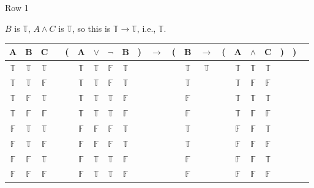 \documentclass[
  ignorenonframetext,
]{beamer}
\renewcommand{\,}{\text{, }}
\def\True{\mathbb{T}}
\def\False{\mathbb{F}}
\begin{document}
\begin{frame}{Row 1}
\protect\hypertarget{row-1}{}

\(B\) is \(\True\), \(A \wedge C\) is \(\True\), so this is
\(\True \rightarrow \True\), i.e., \(\True\).

\begin{center}
\bigskip
\begin{tabular}{@{ }c@{ }@{ }c@{ }@{ }c | c@{ }@{}c@{}@{ }c@{ }@{ }c@{ }@{ }c@{ }@{ }c@{ }@{}c@{}@{ }c@{ }@{}c@{}@{ }c@{ }@{ }c@{ }@{}c@{}@{ }c@{ }@{ }c@{ }@{ }c@{ }@{}c@{}@{}c@{}@{ }c}
A & B & C &  & ( & A & $\vee$ & $\neg$ & B & ) & $\rightarrow$ & ( & B & $\rightarrow$ & ( & A & $\wedge$ & C & ) & ) & \\
\hline 
 $\True$ & $\True$ & $\True$ &  &  & $\True$ & $\True$ & $\False$ & $\True$ &  &&  & $\True$ & $\True$ &  & $\True$ & $\True$ & $\True$ &  &  & \\
 $\True$ & $\True$ & $\False$ &  &  & $\True$ & $\True$ & $\False$ & $\True$ &  &&  & $\True$ &&  & $\True$ & $\False$ & $\False$ &  &  & \\
 $\True$ & $\False$ & $\True$ &  &  & $\True$ & $\True$ & $\True$ & $\False$ &  &&  & $\False$ &&  & $\True$ & $\True$ & $\True$ &  &  & \\
 $\True$ & $\False$ & $\False$ &  &  & $\True$ & $\True$ & $\True$ & $\False$ &  &&  & $\False$ &&  & $\True$ & $\False$ & $\False$ &  &  & \\
 $\False$ & $\True$ & $\True$ &  &  & $\False$ & $\False$ & $\False$ & $\True$ &  &&  & $\True$ &&  & $\False$ & $\False$ & $\True$ &  &  & \\
 $\False$ & $\True$ & $\False$ &  &  & $\False$ & $\False$ & $\False$ & $\True$ &  &&  & $\True$ &&  & $\False$ & $\False$ & $\False$ &  &  & \\
 $\False$ & $\False$ & $\True$ &  &  & $\False$ & $\True$ & $\True$ & $\False$ &  &&  & $\False$ &&  & $\False$ & $\False$ & $\True$ &  &  & \\
 $\False$ & $\False$ & $\False$ &  &  & $\False$ & $\True$ & $\True$ & $\False$ &  &&  & $\False$ &&  & $\False$ & $\False$ & $\False$ &  &  & \\
\end{tabular}
\bigskip
\end{center}

\end{frame}
\end{document}
